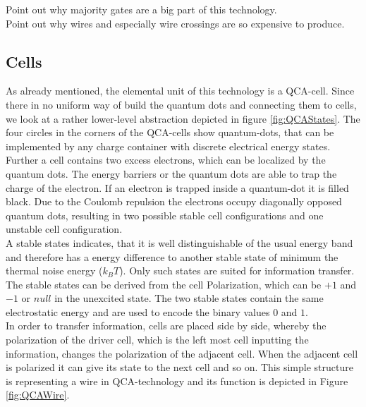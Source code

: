 Point out why majority gates are a big part of this technology. \\
Point out why wires and especially wire crossings are so expensive to produce. \\

\subsection{Cells}
As already mentioned, the elemental unit of this technology is a QCA-cell. Since there in no uniform way of build the quantum dots and connecting them to cells, we look at a rather lower-level abstraction depicted in figure \ref{fig:QCAStates}. The four circles in the corners of the QCA-cells show quantum-dots, that can be implemented by any charge container with discrete electrical energy states. Further a cell contains two excess electrons, which can be localized by the quantum dots. The energy barriers or the quantum dots are able to trap the charge of the electron. If an electron is trapped inside a quantum-dot it is filled black. Due to the Coulomb repulsion the electrons occupy diagonally opposed quantum dots,
resulting in two possible stable cell configurations and one unstable cell configuration.\\
A stable states indicates, that it is well distinguishable of the usual energy band and therefore has a energy difference to another stable state of minimum the thermal noise energy ($k_BT$). Only such states are suited for information transfer. The stable states can be derived from the cell Polarization, which can be $+1$ and $-1$ or $null$ in the unexcited state. The two stable states contain the same electrostatic energy and are used to encode the binary values $0$ and $1$.\\
In order to transfer information, cells are placed side by side, whereby the polarization of the driver cell, which is the left most cell inputting the information, changes the polarization of the adjacent cell. When the adjacent cell is polarized it can give its state to the next cell and so on. This simple structure is representing a wire in QCA-technology and its function is depicted in Figure \ref{fig:QCAWire}.

